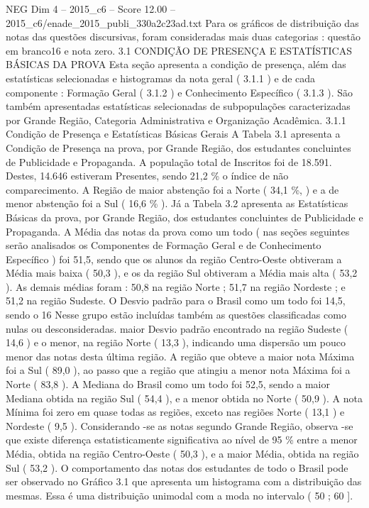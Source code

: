 \begin{textsample}{NEG Dim 4 – 2015\_c6 – Score 12.00 – 2015\_c6/enade\_2015\_publi\_330a2c23ad.txt}
Para os gráficos de distribuição das notas das questões discursivas, foram consideradas mais duas categorias : questão em branco16 e nota zero. 3.1 CONDIÇÃO DE PRESENÇA E ESTATÍSTICAS BÁSICAS DA PROVA Esta seção apresenta a condição de presença, além das estatísticas selecionadas e histogramas da nota geral ( 3.1.1 ) e de cada componente : Formação Geral ( 3.1.2 ) e Conhecimento Específico ( 3.1.3 ).
São também apresentadas estatísticas selecionadas de subpopulações caracterizadas por Grande Região, Categoria Administrativa e Organização Acadêmica. 3.1.1 Condição de Presença e Estatísticas Básicas Gerais A Tabela 3.1 apresenta a Condição de Presença na prova, por Grande Região, dos estudantes concluintes de Publicidade e Propaganda.
A população total de Inscritos foi de 18.591.
Destes, 14.646 estiveram Presentes, sendo 21,2 \% o índice de não comparecimento.
A Região de maior abstenção foi a Norte ( 34,1 \%, ) e a de menor abstenção foi a Sul ( 16,6 \% ).
Já a Tabela 3.2 apresenta as Estatísticas Básicas da prova, por Grande Região, dos estudantes concluintes de Publicidade e Propaganda.
A Média das notas da prova como um todo ( nas seções seguintes serão analisados os Componentes de Formação Geral e de Conhecimento Específico ) foi 51,5, sendo que os alunos da região Centro-Oeste obtiveram a Média mais baixa ( 50,3 ), e os da região Sul obtiveram a Média mais alta ( 53,2 ).
As demais médias foram : 50,8 na região Norte ; 51,7 na região Nordeste ; e 51,2 na região Sudeste.
O Desvio padrão para o Brasil como um todo foi 14,5, sendo o 16 Nesse grupo estão incluídas também as questões classificadas como nulas ou desconsideradas. maior Desvio padrão encontrado na região Sudeste ( 14,6 ) e o menor, na região Norte ( 13,3 ), indicando uma dispersão um pouco menor das notas desta última região.
A região que obteve a maior nota Máxima foi a Sul ( 89,0 ), ao passo que a região que atingiu a menor nota Máxima foi a Norte ( 83,8 ).
A Mediana do Brasil como um todo foi 52,5, sendo a maior Mediana obtida na região Sul ( 54,4 ), e a menor obtida no Norte ( 50,9 ).
A nota Mínima foi zero em quase todas as regiões, exceto nas regiões Norte ( 13,1 ) e Nordeste ( 9,5 ).
Considerando -se as notas segundo Grande Região, observa -se que existe diferença estatisticamente significativa ao nível de 95 \% entre a menor Média, obtida na região Centro-Oeste ( 50,3 ), e a maior Média, obtida na região Sul ( 53,2 ).
O comportamento das notas dos estudantes de todo o Brasil pode ser observado no Gráfico 3.1 que apresenta um histograma com a distribuição das mesmas.
Essa é uma distribuição unimodal com a moda no intervalo ( 50 ; 60 ].

\end{textsample}

